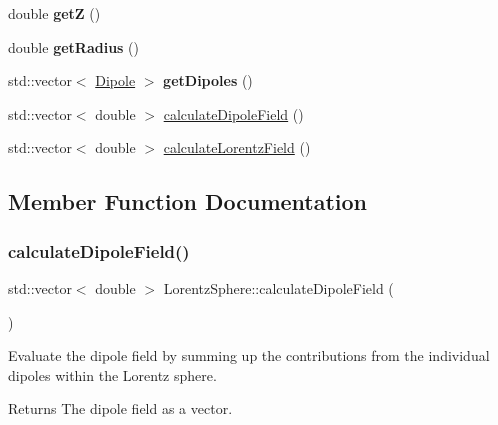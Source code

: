 \begin{DoxyCompactItemize}
double {\bfseries getZ} ()
\item 
\mbox{\label{class_lorentz_sphere_a92a635f089c0e5c5a2960518750f4c42}} 
double {\bfseries get\+Radius} ()
\item 
\mbox{\label{class_lorentz_sphere_aa65e38a2683e00d95971f5ebfcc20b7e}} 
std\+::vector$<$ \mbox{\hyperlink{class_dipole}{Dipole}} $>$ {\bfseries get\+Dipoles} ()
\item 
std\+::vector$<$ double $>$ \mbox{\hyperlink{class_lorentz_sphere_a58e768d89c89cbb12759c49d36f0c9c0}{calculate\+Dipole\+Field}} ()
\item 
std\+::vector$<$ double $>$ \mbox{\hyperlink{class_lorentz_sphere_a061f2c2d2635348d94e14371a32f5758}{calculate\+Lorentz\+Field}} ()
\end{DoxyCompactItemize}


\subsection{Member Function Documentation}
\mbox{\label{class_lorentz_sphere_a58e768d89c89cbb12759c49d36f0c9c0}} 
\subsubsection{\texorpdfstring{calculate\+Dipole\+Field()}{calculateDipoleField()}}
{\footnotesize\ttfamily std\+::vector$<$ double $>$ Lorentz\+Sphere\+::calculate\+Dipole\+Field (\begin{DoxyParamCaption}{ }\end{DoxyParamCaption})}

Evaluate the dipole field by summing up the contributions from the individual dipoles within the Lorentz sphere. \begin{DoxyReturn}{Returns}
The dipole field as a vector. 
\end{DoxyReturn}
\mbox{\label{class_lorentz_sphere_a061f2c2d2635348d94e14371a32f5758}} 
